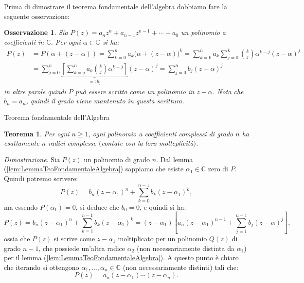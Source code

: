 \documentclass[11pt]{book}
\makeatletter
\theoremstyle{Definizione}
\theoremstyle{TeoremaProposizioneLemmaCorollarioCongettura}
\newtheorem{myteo}{Teorema}[section]
\theoremstyle{OsservazioneNotaEsempio}
\newtheorem{myobs}{Osservazione}[section]
\renewenvironment{proof}[1][\proofname]{\par
  \normalfont \topsep6\p@\@plus6\p@\relax
  \trivlist
  \item[\hskip\labelsep
        \itshape
    #1\@addpunct{.}]\ignorespaces
}{%
  \endtrivlist\@endpefalse
}
\renewenvironment{proof}{\textsl{Dimostrazione}.}{}
\newcommand{\C}{\mathbb{C}}
\makeatother
\begin{document}
\noindent
Prima di dimostrare il teorema fondamentale dell'algebra dobbiamo fare la seguente osservazione:
\begin{myobs}
Sia $P(z) = a_nz^{n}+a_{n-1}z^{n-1}+\cdots + a_0$ un polinomio a coefficienti in $\C$. Per ogni $\alpha\in \C$ si ha:
\begin{align*}
P(z) &= P(\alpha+(z-\alpha)) = \sum_{k = 0}^n a_k \big(\alpha+(z-\alpha)\big)^k = \sum_{k = 0}^n a_k\sum_{j = 0}^k \binom{k}{j} \alpha^{k-j}(z-\alpha)^{j}\\
&= \sum_{j = 0}^n \underbrace{\left[\sum_{k = j}^n a_k\binom{k}{j} \alpha^{k-j}\right]}_{=: b_j} (z-\alpha)^j = \sum_{j = 0}^n b_j (z-\alpha)^j 
\end{align*}
in altre parole quindi $P$ può essere scritto come un polinomio in $z-\alpha$. Nota che $b_n = a_n$, quindi il grado viene mantenuto in questa scrittura.
\end{myobs}
\begin{boxteo}{Teorema fondamentale dell'Algebra}
\begin{myteo}
Per ogni $n\geq 1$, ogni polinomio a coefficienti complessi di grado $n$ ha esattamente $n$ radici complesse $($contate con la loro molteplicità$)$.
\end{myteo}
\tcblower
\begin{proof}
Sia $P(z)$ un polinomio di grado $n$. Dal lemma (\ref{lem:LemmaTeoFondamentaleAlgebra}) sappiamo che esiste $\alpha_1\in \C$ zero di $P$. Quindi potremo scrivere:
$$
P(z) = b_n (z-\alpha_1)^n + \sum_{k = 0}^{n-1} b_{k}(z-\alpha_1)^k,
$$
ma essendo $P(\alpha_1) = 0$, si deduce che $b_0 = 0$, e quindi si ha:
$$
P(z) = b_n (z-\alpha_1)^n + \sum_{k = 1}^{n-1} b_{k}(z-\alpha_1)^k = (z-\alpha_1)\left[a_n(z-\alpha_1)^{n-1} + \sum_{j = 1}^{n-1} b_j(z-\alpha)^{j}\right],
$$
ossia che $P(z)$ si scrive come $z-\alpha_1$ moltiplicato per un polinomio $Q(z)$ di grado $n-1$, che possiede un'altra radice $\alpha_2$ (non necessariamente distinta da $\alpha_1$) per il lemma (\ref{lem:LemmaTeoFondamentaleAlgebra}). A questo punto è chiaro che iterando si ottengono $\alpha_1,\dots,\alpha_n\in\C$ (non necessariamente distinti) tali che:
$$
P(z) = a_n(z-\alpha_1)\cdots (z-\alpha_n).
$$
\end{proof}
\end{boxteo}
\noindent
\end{document}
